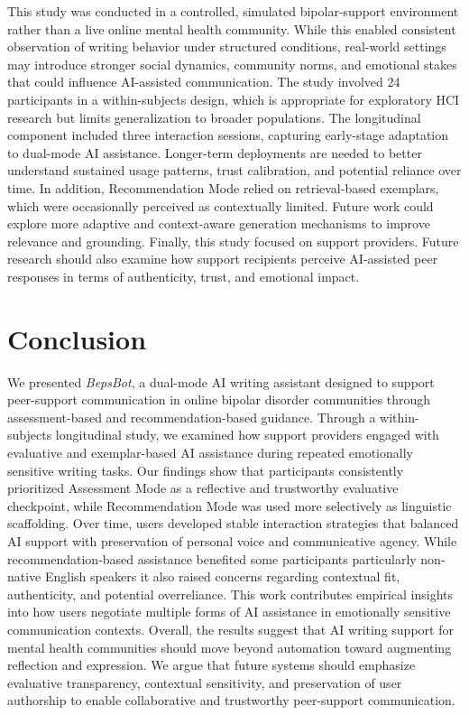 \documentclass[]{llncs}
\begin{document}
This study was conducted in a controlled, simulated bipolar-support environment rather than a live online mental health community. While this enabled consistent observation of writing behavior under structured conditions, real-world settings may introduce stronger social dynamics, community norms, and emotional stakes that could influence AI-assisted communication. The study involved 24 participants in a within-subjects design, which is appropriate for exploratory HCI research \cite{caine2016local} but limits generalization to broader populations.  The longitudinal component included three interaction sessions, capturing early-stage adaptation to dual-mode AI assistance. Longer-term deployments are needed to better understand sustained usage patterns, trust calibration, and potential reliance over time. In addition, Recommendation Mode relied on retrieval-based exemplars, which were occasionally perceived as contextually limited. Future work could explore more adaptive and context-aware generation mechanisms to improve relevance and grounding. Finally, this study focused on support providers. Future research should also examine how support recipients perceive AI-assisted peer responses in terms of authenticity, trust, and emotional impact.
\section{Conclusion}

We presented \textit{BepsBot}, a dual-mode AI writing assistant designed to support peer-support communication in online bipolar disorder communities through assessment-based and recommendation-based guidance. Through a within-subjects longitudinal study, we examined how support providers engaged with evaluative and exemplar-based AI assistance during repeated emotionally sensitive writing tasks. Our findings show that participants consistently prioritized Assessment Mode as a reflective and trustworthy evaluative checkpoint, while Recommendation Mode was used more selectively as linguistic scaffolding. Over time, users developed stable interaction strategies that balanced AI support with preservation of personal voice and communicative agency. While recommendation-based assistance benefited some participants particularly non-native English speakers it also raised concerns regarding contextual fit, authenticity, and potential overreliance. This work contributes empirical insights into how users negotiate multiple forms of AI assistance in emotionally sensitive communication contexts. Overall, the results suggest that AI writing support for mental health communities should move beyond automation toward augmenting reflection and expression. We argue that future systems should emphasize evaluative transparency, contextual sensitivity, and preservation of user authorship to enable collaborative and trustworthy peer-support communication.



\end{document}
